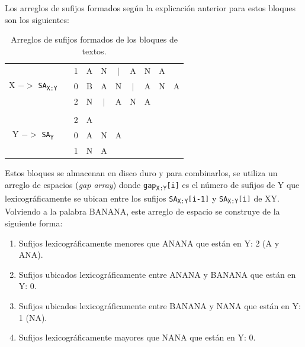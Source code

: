 Los arreglos de sufijos formados según la explicación anterior para estos bloques son los siguientes:

\newpage

\begin{table}[h]
\centering
\begin{tabular}{cccccccccc}
\cline{3-3}
                   & \multicolumn{1}{c|}{} & \multicolumn{1}{c|}{1} & A & N & $|$ & A & N & A &   \\ \cline{3-3}
X $->$ \texttt{SA\textsubscript{X:Y}} & \multicolumn{1}{c|}{} & \multicolumn{1}{c|}{0} & B & A & N & $|$ & A & N & A \\ \cline{3-3}
                   & \multicolumn{1}{c|}{} & \multicolumn{1}{c|}{2} & N & $|$ & A & N & A &   &   \\ \cline{3-3}
                   &                       &                        &   &   &   &   &   &   &   \\ \cline{3-3}
                   & \multicolumn{1}{c|}{} & \multicolumn{1}{c|}{2} & A &   &   &   &   &   &   \\ \cline{3-3}
Y $->$ \texttt{SA\textsubscript{Y}} & \multicolumn{1}{c|}{} & \multicolumn{1}{c|}{0} & A & N & A &   &   &   &   \\ \cline{3-3}
                   & \multicolumn{1}{c|}{} & \multicolumn{1}{c|}{1} & N & A &   &   &   &   &   \\ \cline{3-3}
\end{tabular}
\caption{Arreglos de sufijos formados de los bloques de textos.}
\end{table}

Estos bloques se almacenan en disco duro y para combinarlos, se utiliza un arreglo de espacios (\textit{gap array}) donde \texttt{gap\textsubscript{X:Y}[i]} es el número de sufijos de Y que lexicográficamente se ubican entre los sufijos \texttt{SA\textsubscript{X:Y}[i-1]} y \texttt{SA\textsubscript{X:Y}[i]} de XY. Volviendo a la palabra BANANA, este arreglo de espacio se construye de la siguiente forma:

\begin{enumerate}

\item Sufijos lexicográficamente menores que ANANA que están en Y: 2 (A y ANA).
\item Sufijos ubicados lexicográficamente entre ANANA y BANANA que están en Y: 0.
\item Sufijos ubicados lexicográficamente entre BANANA y NANA que están en Y: 1 (NA).
\item Sufijos lexicográficamente mayores que NANA que están en Y: 0.

\end{enumerate}

